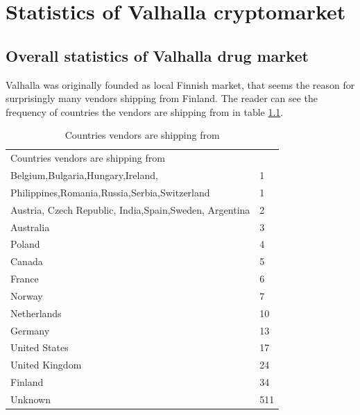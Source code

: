 \documentclass[
  digital, %
  table,   %
  lof,     %
  lot,     %
  oneside
]{fithesis3}
\begin{document}
\chapter{Statistics of Valhalla cryptomarket}

\section{Overall statistics of Valhalla drug market}

Valhalla was originally founded as local Finnish market,
that seems the reason for surprisingly many vendors shipping from Finland.
The reader can see the frequency of countries the vendors are shipping from in table \ref{shipcount}.

\begin{table}
    \caption{Countries vendors are shipping from}
    \label{shipcount}
    \begin{tabular}{|l|l|}
    Countries vendors are shipping from\\
      Belgium,Bulgaria,Hungary,Ireland, & 1\\
      Philippines,Romania,Russia,Serbia,Switzerland& 1   \\
        Austria, Czech Republic, India,Spain,Sweden, Argentina  & 2   \\
        Australia                                    & 3   \\ 
        Poland                                       & 4   \\ 
        Canada                                       & 5   \\ 
        France                                       & 6   \\ 
        Norway                                       & 7   \\ 
        Netherlands                                  & 10  \\ 
        Germany                                      & 13  \\ 
        United States                                & 17  \\ 
        United Kingdom                               & 24  \\ 
        Finland                                      & 34  \\ 
        Unknown                                      & 511  
    \end{tabular}
\end{table}
\end{document}
